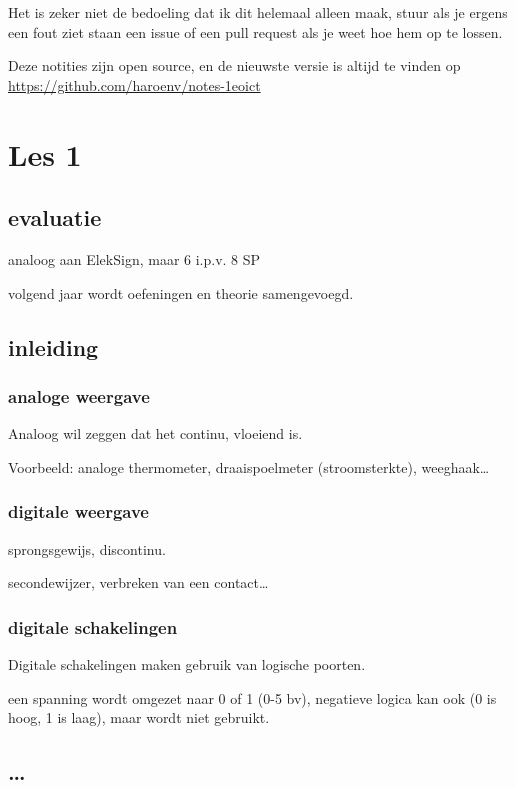 \documentclass[11pt, a4paper]{report}
\begin{document}
Het is zeker niet de bedoeling dat ik dit helemaal alleen maak, stuur als je ergens een fout ziet staan een issue of een pull request als je weet hoe hem op te lossen.

Deze notities zijn open source, en de nieuwste versie is altijd te vinden op \url{https://github.com/haroenv/notes-1eoict}

\chapter{Les 1}

\section{evaluatie}

analoog aan ElekSign, maar 6 i.p.v. 8 SP

volgend jaar wordt oefeningen en theorie samengevoegd.

\section{inleiding}

\subsection{analoge weergave}

Analoog wil zeggen dat het continu, vloeiend is.

Voorbeeld: analoge thermometer, draaispoelmeter (stroomsterkte), weeghaak\dots

\subsection{digitale weergave}

sprongsgewijs, discontinu.

secondewijzer, verbreken van een contact\dots

\subsection{digitale schakelingen}

Digitale schakelingen maken gebruik van logische poorten.

een spanning wordt omgezet naar 0 of 1 (0-5 bv), negatieve logica kan ook (0 is hoog, 1 is laag), maar wordt niet gebruikt.

\section{\dots}
\end{document}

